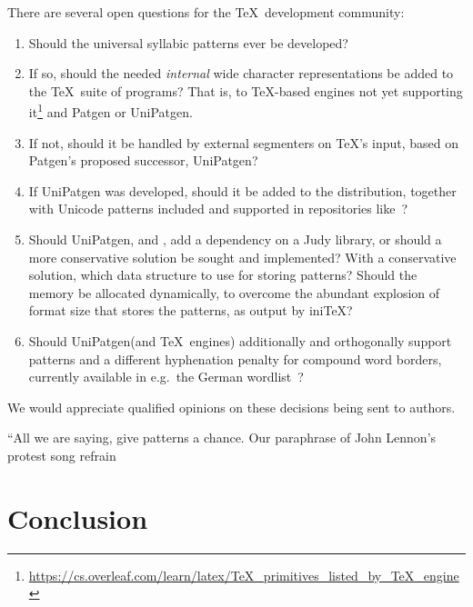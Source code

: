 \documentclass{csbulletin}
\let\stress=\emph
\let\program=\textrm %
\newcommand{\Patgen}{\program{Patgen}\xspace}
\newcommand{\XPatgen}{\program{UniPatgen}\xspace}
\newcommand\motto[3]{\vspace{#1\baselineskip}\pagebreak[3]
\begin{flushright}\small#3
\end{flushright}%
\vspace*{#2\baselineskip}%
}
\begin{document}
There are several open questions for the \TeX\ development community:
\begin{enumerate}
    \item Should the universal syllabic patterns ever be developed?
    \item %
    If so, should the needed \stress{internal} wide character representations be added to the \TeX\ suite of programs?
    That is, to \TeX-based engines not yet supporting it\footnote{\raggedright\url{https://cs.overleaf.com/learn/latex/TeX_primitives_listed_by_TeX_engine}} and \Patgen or \XPatgen.
    \item If not, should it be handled by external segmenters on \TeX's input, based on \Patgen's proposed successor, \XPatgen?
    \item If \XPatgen was developed, should it be added to the distribution, together with Unicode patterns included and supported in repositories like~\cite{tex:hyphenationweb-2023-07-05}?
    \item Should \XPatgen, and \LuaTeX, add a dependency on a Judy library, or should a more conservative solution be sought and implemented?
    With a conservative solution, which data structure to use for storing patterns?
    Should the memory be allocated dynamically, to overcome the abundant explosion of format size that stores the patterns, as output by ini\TeX? 
    \item Should \XPatgen (and \TeX\ engines) additionally and orthogonally support patterns and a different hyphenation penalty for compound word borders, currently available in e.g.\ the German wordlist~\cite{nlp:Germantrennmuster}?
\end{enumerate}
We would appreciate qualified opinions on these decisions being sent to authors.



\motto{1}{-2.2}{\hfill``All we are saying, give patterns a chance.\rlap{''}\newline
Our paraphrase of John Lennon's protest song refrain}

\section{Conclusion}
\label{sec:conclusion}
\end{document}

